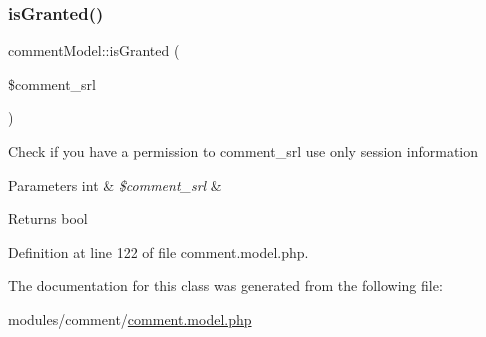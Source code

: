 \subsubsection{\texorpdfstring{is\+Granted()}{isGranted()}}
{\footnotesize\ttfamily comment\+Model\+::is\+Granted (\begin{DoxyParamCaption}\item[{}]{\$comment\+\_\+srl }\end{DoxyParamCaption})}

Check if you have a permission to comment\+\_\+srl use only session information 
\begin{DoxyParams}[1]{Parameters}
int & {\em \$comment\+\_\+srl} & \\
\hline
\end{DoxyParams}
\begin{DoxyReturn}{Returns}
bool 
\end{DoxyReturn}


Definition at line 122 of file comment.\+model.\+php.



The documentation for this class was generated from the following file\+:\begin{DoxyCompactItemize}
\item 
modules/comment/\hyperlink{comment_8model_8php}{comment.\+model.\+php}\end{DoxyCompactItemize}
